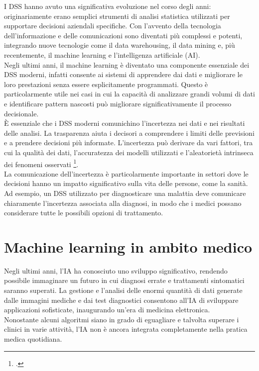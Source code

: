 I DSS hanno avuto una significativa evoluzione nel corso degli anni: originariamente erano semplici strumenti di analisi statistica utilizzati per supportare decisioni aziendali specifiche. Con l'avvento della tecnologia dell'informazione e delle comunicazioni sono diventati più complessi e potenti, integrando nuove tecnologie come il data warehousing, il data mining e, più recentemente, il machine learning e l'intelligenza artificiale (AI).\\
Negli ultimi anni, il machine learning è diventato una componente essenziale dei DSS moderni, infatti consente ai sistemi di apprendere dai dati e migliorare le loro prestazioni senza essere esplicitamente programmati. Questo è particolarmente utile nei casi in cui la capacità di analizzare grandi volumi di dati e identificare pattern nascosti può migliorare significativamente il processo decisionale.\\
È essenziale che i DSS moderni comunichino l'incertezza nei dati e nei risultati delle analisi. La trasparenza aiuta i decisori a comprendere i limiti delle previsioni e a prendere decisioni più informate. L'incertezza può derivare da vari fattori, tra cui la qualità dei dati, l'accuratezza dei modelli utilizzati e l'aleatorietà intrinseca dei fenomeni osservati \footcite{womak:role-decision-making}.\\
La comunicazione dell'incertezza è particolarmente importante in settori dove le decisioni hanno un impatto significativo sulla vita delle persone, come la sanità. Ad esempio, un DSS utilizzato per diagnosticare una malattia deve comunicare chiaramente l'incertezza associata alla diagnosi, in modo che i medici possano considerare tutte le possibili opzioni di trattamento.\\


\section{Machine learning in ambito medico }

Negli ultimi anni, l'IA ha conosciuto uno sviluppo significativo, rendendo possibile immaginare un futuro in cui diagnosi errate e trattamenti sintomatici saranno superati. La gestione e l'analisi delle enormi quantità di dati generate dalle immagini mediche e dai test diagnostici consentono all'IA di sviluppare applicazioni sofisticate, inaugurando un'era di medicina elettronica.\\
Nonostante alcuni algoritmi siano in grado di eguagliare e talvolta superare i clinici in varie attività, l'IA non è ancora integrata completamente nella pratica medica quotidiana.\\

